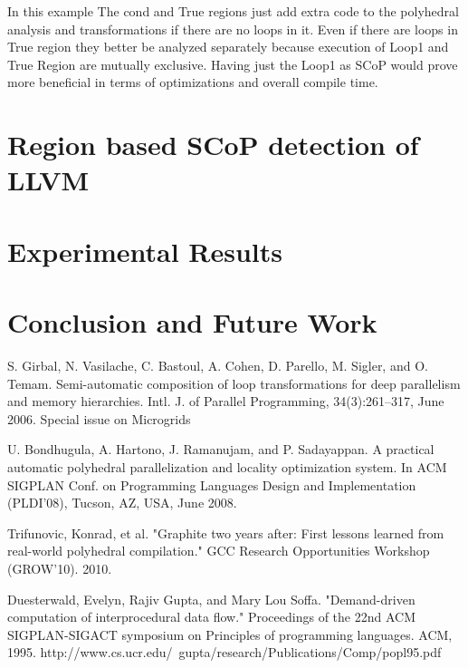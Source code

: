 \begin{comment}
Scop
Cond
|
|--True Region
|
|--False Region
|       | Loop1
|       |
\end{comment}

In this example The cond and True regions just add extra code to the polyhedral analysis and transformations if there
are no loops in it. Even if there are loops in True region they better be analyzed separately because
execution of Loop1 and True Region are mutually exclusive.
Having just the Loop1 as SCoP would prove more beneficial in terms of optimizations and overall compile time.


\section{Region based SCoP detection of LLVM}


\section{Experimental Results}

\section{Conclusion and Future Work}



S. Girbal, N. Vasilache, C. Bastoul, A. Cohen, D. Parello, M. Sigler, and O. Temam.
Semi-automatic composition of loop transformations for deep parallelism and memory
hierarchies. Intl. J. of Parallel Programming, 34(3):261–317, June 2006. Special issue on
Microgrids


U. Bondhugula, A. Hartono, J. Ramanujam, and P. Sadayappan. A practical automatic
polyhedral parallelization and locality optimization system. In ACM SIGPLAN Conf. on
Programming Languages Design and Implementation (PLDI’08), Tucson, AZ, USA, June
2008.

Trifunovic, Konrad, et al. "Graphite two years after: First lessons learned
from real-world polyhedral compilation."
GCC Research Opportunities Workshop (GROW'10). 2010.


Duesterwald, Evelyn, Rajiv Gupta, and Mary Lou Soffa. "Demand-driven computation of interprocedural data flow." Proceedings of the 22nd ACM SIGPLAN-SIGACT symposium on Principles of programming languages. ACM, 1995.
http://www.cs.ucr.edu/~gupta/research/Publications/Comp/popl95.pdf

